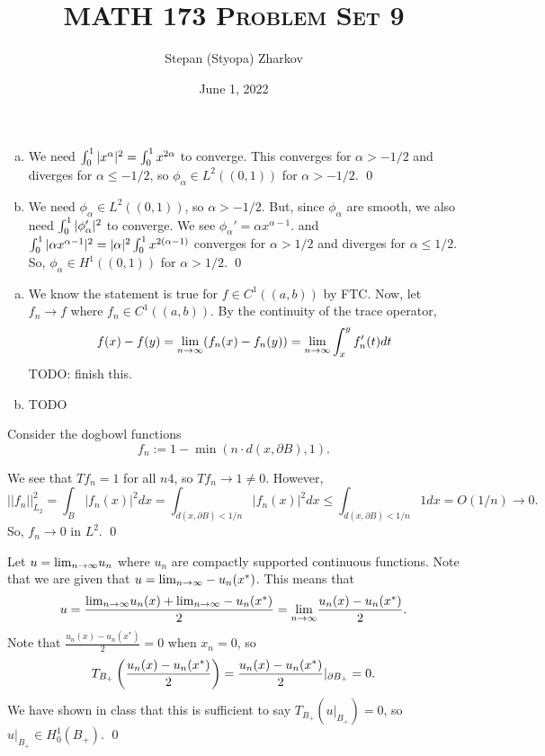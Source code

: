 \documentclass{article}
\title{\textsc{MATH 173 Problem Set 9}}
\author{Stepan (Styopa) Zharkov}
\date{June 1, 2022}
\renewcommand{\d}{\partial}
\begin{document}
\maketitle
{} 
\tri
\hop 
\solution

\newpage
{} 
\tri
\hop 
\solution
\begin{enumerate}[(a)]
    \item We need $\int_0^1 |x^\alpha|^2 = \int_0^1 x^{2\alpha}$ to converge. This converges for $\alpha > -1/2$ and diverges for $\alpha \le -1/2$, so $\phi_\alpha \in L^2((0,1))$ for $\alpha > -1/2$. \qed
    \item We need $\phi_\alpha \in L^2((0,1))$, so $\alpha > -1/2$. But, since $\phi_\alpha$ are smooth, we also need $\int_0^1 |\phi_\alpha ' |^2$ to converge. We see $\phi_\alpha' = \alpha x^{\alpha-1}$. and $\int_0^1 |\alpha x^{\alpha-1}|^2 = |\alpha|^2\int_0^1 x^{2(\alpha-1)}$ converges for $\alpha > 1/2$ and diverges for $\alpha \le 1/2$. So, $\phi_\alpha \in H^1((0,1))$ for $\alpha > 1/2$. \qed
\end{enumerate}

\newpage
{} 
\tri
\hop 
\solution
\begin{enumerate}[(a)]
    \item We know the statement is true for $f \in C^1((a,b))$ by FTC. Now, let $f_n \to f$ where $f_n \in C^1((a,b))$. By the continuity of the trace operator, 
    \[f(x) - f(y) = {\lim_{n \to \infty}} (f_n(x)-f_n(y)) = {\lim_{n \to \infty}} \int_x^yf_n'(t)dt\]
    TODO: finish this.
    \item TODO
\end{enumerate}

\newpage
{} 
\tri
\hop 
\solution

\newpage
{} 
\tri
\hop 
\solution Consider the dogbowl functions 
\[f_n := 1-\min(n\cdot d(x, \d B), 1).\]


We see that $Tf_n = 1$ for all $n4$, so $Tf_n \to 1 \ne 0$. However, 
\[||f_n||_{L_2}^2 = \int_B |f_n(x)|^2dx = \int_{d(x,\d B)< 1/n} |f_n(x)|^2dx \le  \int_{d(x,\d B)< 1/n} 1 dx  = O(1/n) \to 0.\]
So, $f_n \to 0$ in $L^2$. \qed
 
\newpage
{} 
\tri
\hop 
\solution Let $u = {\lim_{n \to \infty}} u_n$ where $u_n$ are compactly supported continuous functions. Note that we are given that $u = {\lim_{n \to \infty}} -u_n(x^*)$. This means that 
\[u = \frac{ {\lim_{n \to \infty}} u_n(x) + {\lim_{n \to \infty}} -u_n(x^*)}{2}= {\lim_{n \to \infty}} \frac{u_n(x)-u_n(x^*)}{2}.\]
Note that $\frac{u_n(x)-u_n(x^*)}{2}= 0$ when $x_n =0$, so 
\[T_{B_+}\del{\frac{u_n(x)-u_n(x^*)}{2}} =\frac{u_n(x)-u_n(x^*)}{2}|_{\d B_+} = 0.\]
We have shown in class that this is sufficient to say $T_{B_+}(u|_{B_+}) = 0$, so $u|_{B_+}\in H_0^1(B_+)$. \qed
\end{document}
